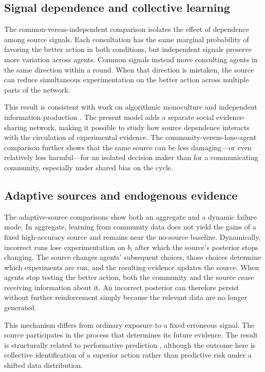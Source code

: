 \documentclass[10pt,letterpaper,twocolumn]{article}
\begin{document}
\subsection{Signal dependence and collective learning}

The common-versus-independent comparison isolates the effect of dependence among source signals. Each consultation has the same marginal probability of favoring the better action in both conditions, but independent signals preserve more variation across agents. Common signals instead move consulting agents in the same direction within a round. When that direction is mistaken, the source can reduce simultaneous experimentation on the better action across multiple parts of the network.

This result is consistent with work on algorithmic monoculture and independent information production \citep{kleinberg2021,heddenraghavan2026}. The present model adds a separate social evidence-sharing network, making it possible to study how source dependence interacts with the circulation of experimental evidence. The community-versus-lone-agent comparison further shows that the same source can be less damaging---or even relatively less harmful---for an isolated decision maker than for a communicating community, especially under shared bias on the cycle.

\subsection{Adaptive sources and endogenous evidence}

The adaptive-source comparisons show both an aggregate and a dynamic failure mode. In aggregate, learning from community data does not yield the gains of a fixed high-accuracy source and remains near the no-source baseline. Dynamically, incorrect runs lose experimentation on $b$, after which the source's posterior stops changing. The source changes agents' subsequent choices, those choices determine which experiments are run, and the resulting evidence updates the source. When agents stop testing the better action, both the community and the source cease receiving information about it. An incorrect posterior can therefore persist without further reinforcement simply because the relevant data are no longer generated.

This mechanism differs from ordinary exposure to a fixed erroneous signal. The source participates in the process that determines its future evidence. The result is structurally related to performative prediction \citep{perdomo2020}, although the outcome here is collective identification of a superior action rather than predictive risk under a shifted data distribution.
\end{document}
